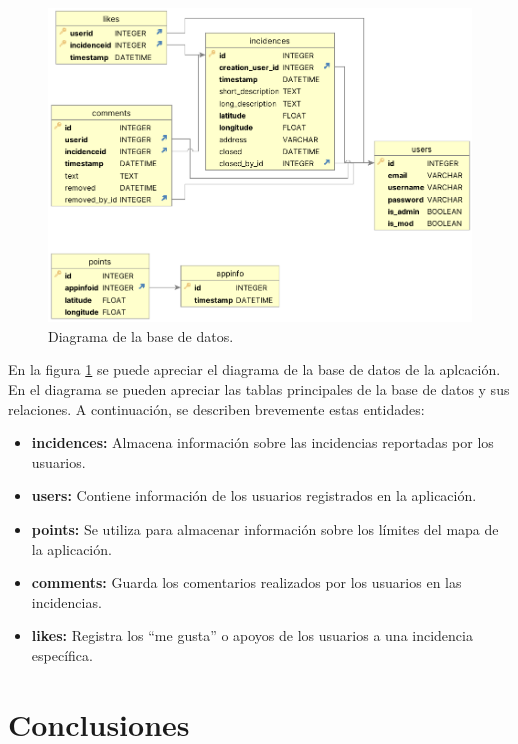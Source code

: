 \documentclass{article}
\begin{document}
\begin{figure}[H]
    \centering
    \includegraphics[width=14cm]{images/db-diagrama.png}
    \caption{Diagrama de la base de datos.}
    \label{fig:diagrama_bd}
\end{figure}

En la figura \ref{fig:diagrama_bd} se puede apreciar el diagrama de la base de datos de la aplcación. En el diagrama se pueden apreciar las tablas principales de la base de datos y sus relaciones. A continuación, se describen brevemente estas entidades:

\begin{itemize}
    \item \textbf{incidences:} Almacena información sobre las incidencias reportadas por los usuarios.
    \item \textbf{users:} Contiene información de los usuarios registrados en la aplicación.
    \item \textbf{points:} Se utiliza para almacenar información sobre los límites del mapa de la aplicación.
    \item \textbf{comments:} Guarda los comentarios realizados por los usuarios en las incidencias.
    \item \textbf{likes:} Registra los ``me gusta'' o apoyos de los usuarios a una incidencia específica.
\end{itemize}

\newpage

\section{Conclusiones}
\end{document}

